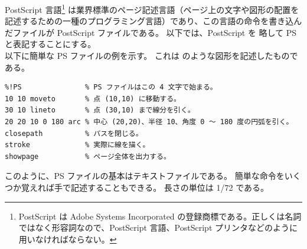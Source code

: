 PostScript 言語\footnote{PostScript は Adobe Systems Incorporated の登録商標である。正しくは名詞ではなく形容詞なので、PostScript 言語、PostScript プリンタなどのように用いなければならない。} は業界標準のページ記述言語（ページ上の文字や図形の配置を記述するための一種のプログラミング言語）であり、この言語の命令を書き込んだファイルが PostScript ファイルである。
以下では、PostScript を 略して PS と表記することにする。\\

以下に簡単な PS ファイルの例を示す。
これは  のような図形を記述したものである。
\begin{mdframed}[roundcorner=0.50zw,leftmargin=3.00zw,rightmargin=3.00zw,skipabove=0.40zw,skipbelow=0.40zw,innertopmargin=4.00pt,innerbottommargin=4.00pt,innerleftmargin=5.00pt,innerrightmargin=5.00pt,linecolor=gray!020,linewidth=0.50pt,backgroundcolor=gray!20]
\begin{verbatim}
%!PS               % PS ファイルはこの 4 文字で始まる。
10 10 moveto       % 点 (10,10) に移動する。
30 10 lineto       % 点 (30,10) まで線分を引く。
20 20 10 0 180 arc % 中心 (20,20)、半径 10、角度 0 ～ 180 度の円弧を引く。
closepath          % パスを閉じる。
stroke             % 実際に線を描く。
showpage           % ページ全体を出力する。
\end{verbatim}
\end{mdframed}
このように、PS ファイルの基本はテキストファイルである。
簡単な命令をいくつか覚えれば手で記述することもできる。
長さの単位は 1/72 である。\\

